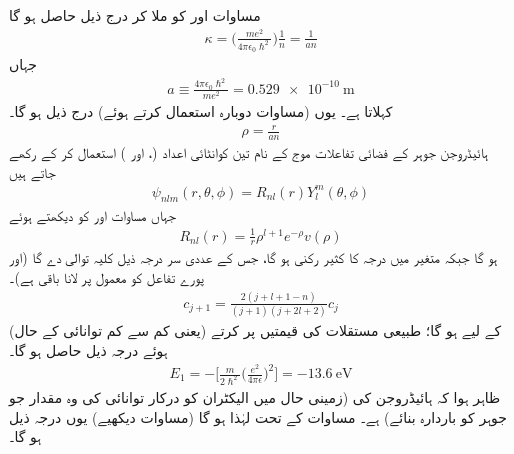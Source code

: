  مساوات   اور  کو ملا کر درج ذیل حاصل ہو گا
\begin{align}
\kappa =\big(\frac{me^{2}}{4\pi\epsilon_{0}\hslash^{2}}\big)\frac{1}{n}=\frac{1}{an} 
\end{align}
جہاں
\begin{align}\label{مساوات_تین_ابعادی_رداس_بوہر}
a\equiv\frac{4\pi\epsilon_{0}\hslash^{2}}{me^{2}}=\SI{0.529e-10}{\meter}
\end{align}
 کہلاتا ہے۔ یوں (مساوات  دوبارہ استعمال کرتے ہوئے) درج ذیل ہو گا۔
\begin{align}
\rho=\frac{r}{an} 
\end{align}
ہائیڈروجن جوہر کے فضائی تفاعلات  موج کے نام تین کوانٹائی اعداد (،  اور ) استعمال کر کے رکھے جاتے ہیں 
 \begin{align}
\psi_{nlm}(r,\theta,\phi)=R_{nl}(r)Y_{l}^{m}(\theta,\phi) 
\end{align}
 جہاں مساوات  اور  کو دیکھتے ہوئے
 \begin{align}
R_{nl}(r)=\frac{1}{r}\rho^{l+1}e^{-\rho}v(\rho) 
\end{align} 
 ہو گا  جبکہ  متغیر  میں درجہ   کا کثیر رکنی ہو گا، جس کے عددی سر  درجہ ذیل کلیہ توالی دے گا (اور پورے تفاعل کو معمول پر لانا باقی ہے)۔
 \begin{align}\label{مساوات_ابعادی_کلیہ_توالی_کولمب_مخفیہ}
c_{j+1}=\frac{2(j+l+1-n)}{(j+1)(j+2l+2)}c_{j} 
\end{align}
 (یعنی کم سے کم توانائی کے حال)  کے لیے 
  ہو گا؛ طبیعی مستقلات کی  قیمتیں پر کرتے ہوئے درجہ ذیل حاصل ہو گا۔
 \begin{align}\label{مساوات_تین_ابعاد_ہائیڈروجن_بندشی_توانائی}
E_{1}=-\big[\frac{m}{2\hslash^{2}}\big(\frac{e^{2}}{4\pi\epsilon}\big)^{2}\big]=\SI{-13.6}{\electronvolt}
\end{align}
 ظاہر ہوا کہ  ہائیڈروجن کی  (زمینی حال میں الیکٹران کو درکار  توانائی کی وہ مقدار جو جوہر کو باردارہ بنائے)   ہے۔ مساوات  کے تحت   لہٰذا   ہو گا (مساوات  دیکھیے) یوں درجہ ذیل ہو گا۔
